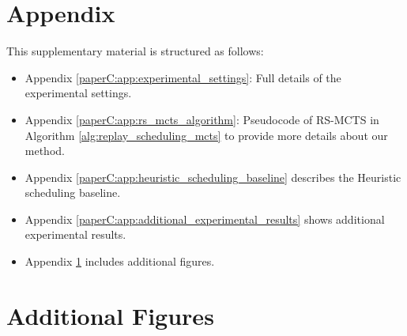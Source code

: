 

\section*{Appendix}
This supplementary material is structured as follows: 
\begin{itemize}
	\item Appendix \ref{paperC:app:experimental_settings}: Full details of the experimental settings.
	\item Appendix \ref{paperC:app:rs_mcts_algorithm}: Pseudocode of RS-MCTS in Algorithm \ref{alg:replay_scheduling_mcts} to provide more details about our method. 
	\item Appendix \ref{paperC:app:heuristic_scheduling_baseline} describes the Heuristic scheduling baseline.
	\item Appendix \ref{paperC:app:additional_experimental_results} shows additional experimental results. 
	\item Appendix \ref{paperC:app:additional_figures} includes additional figures. 
\end{itemize}




%
%

%








\clearpage



\section{Additional Figures}\label{paperC:app:additional_figures}

